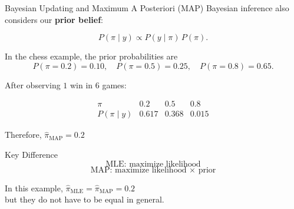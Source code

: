 \documentclass[12pt]{beamer}
\begin{document}
\begin{frame}{}
\begin{block}{Bayesian Updating and Maximum A Posteriori (MAP)}
Bayesian inference also considers our \textbf{prior belief}:

\[
P(\pi \mid y)
\propto
P(y\mid\pi)\,P(\pi).
\]

In the chess example, the prior probabilities are
\[
P(\pi=0.2)=0.10,\quad
P(\pi=0.5)=0.25,\quad
P(\pi=0.8)=0.65.
\]

After observing $1$ win in $6$ games:

\[
\begin{array}{c|ccc}
\pi & 0.2 & 0.5 & 0.8 \\ \hline
P(\pi\mid y) & 0.617 & 0.368 & 0.015
\end{array}
\]

Therefore, $\boxed{\hat{\pi}_{\text{MAP}} = 0.2}$
\end{block}
\end{frame}

\begin{frame}{}
\begin{block}{Key Difference}
\[
\text{MLE: maximize likelihood}
\]
\[
\text{MAP: maximize likelihood $\times$ prior}
\]
\end{block}

In this example,
$
\boxed{\hat{\pi}_{\text{MLE}}
=
\hat{\pi}_{\text{MAP}}
=
0.2}
$\\
but they do not have to be equal in general.
\end{frame}
\end{document}
